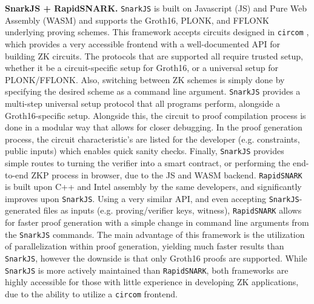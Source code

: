 \textbf{SnarkJS + RapidSNARK.}
\texttt{SnarkJS} \cite{baylina2020iden3} is built on Javascript (JS) and Pure Web Assembly (WASM) and supports the Groth16, PLONK, and FFLONK underlying proving schemes. This framework accepts circuits designed in \texttt{circom} \cite{munoz2022circom}, which provides a very accessible frontend with a well-documented API for building ZK circuits. The protocols that are supported all require trusted setup, whether it be a circuit-specific setup for Groth16, or a universal setup for PLONK/FFLONK. Also, switching between ZK schemes is simply done by specifying the desired scheme as a command line argument. \texttt{SnarkJS} provides a multi-step universal setup protocol that all programs perform, alongside a Groth16-specific setup. Alongside this, the circuit to proof compilation process is done in a modular way that allows for closer debugging. In the proof generation process, the circuit characteristic's are listed for the developer (e.g. constraints, public inputs) which enables quick sanity checks. Finally, \texttt{SnarkJS} provides simple routes to turning the verifier into a smart contract, or performing the end-to-end ZKP process in browser, due to the JS and WASM backend. \texttt{RapidSNARK} \cite{RapidSNARK} is built upon C++ and Intel assembly by the same developers, and significantly improves upon \texttt{SnarkJS}. Using a very similar API, and even accepting \texttt{SnarkJS}-generated files as inputs (e.g. proving/verifier keys, witness), \texttt{RapidSNARK} allows for faster proof generation with a simple change in command line arguments from the \texttt{SnarkJS} commands. The main advantage of this framework is the utilization of parallelization within proof generation, yielding much faster results than \texttt{SnarkJS}, however the downside is that only Groth16 proofs are supported. While \texttt{SnarkJS} is more actively maintained than \texttt{RapidSNARK}, both frameworks are highly accessible for those with little experience in developing ZK applications, due to the ability to utilize a \texttt{circom} frontend.

